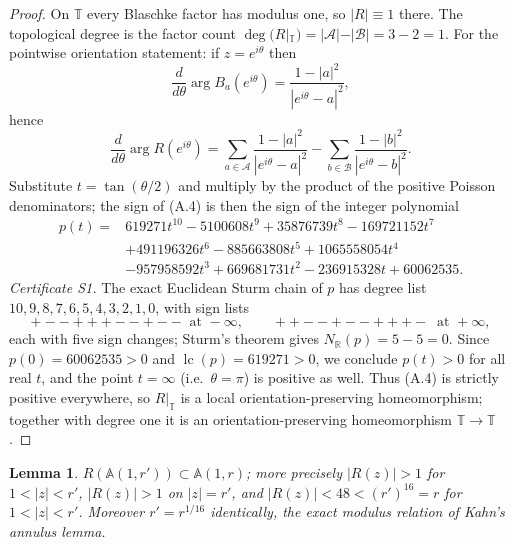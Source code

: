 \documentclass[11pt,reqno]{amsart}
\newtheorem{lemma}[theorem]{Lemma}
\theoremstyle{definition}
\theoremstyle{remark}
\begin{document}
\begin{proof}
On \(\mathbb T\) every Blaschke factor has modulus one, so \(|R|\equiv1\) there. The topological degree is the factor count \(\deg(R|_{\mathbb T})=|\mathcal A|-|\mathcal B|=3-2=1\).
For the pointwise orientation statement: if \(z=e^{i\theta}\) then
\[ \frac{d}{d\theta}\arg B_a(e^{i\theta})=\frac{1-|a|^2}{|e^{i\theta}-a|^2}, \]
hence
\[ \frac{d}{d\theta}\arg R(e^{i\theta})=\sum_{a\in\mathcal A}\frac{1-|a|^2}{|e^{i\theta}-a|^2}-\sum_{b\in\mathcal B}\frac{1-|b|^2}{|e^{i\theta}-b|^2}. \tag{A.4} \]
Substitute \(t=\tan(\theta/2)\) and multiply by the product of the positive Poisson denominators; the sign of (A.4) is then the sign of the integer polynomial
\[\begin{aligned} p(t)={}&619271t^{10}-5100608t^{9}+35876739t^{8}-169721152t^{7}\\ &+491196326t^{6}-885663808t^{5}+1065558054t^{4}\\ &-957958592t^{3}+669681731t^{2}-236915328t+60062535. \end{aligned}\tag{A.5}\]
\emph{Certificate S1.} The exact Euclidean Sturm chain of \(p\) has degree list \(10,9,8,7,6,5,4,3,2,1,0\), with sign lists
\[ +--+++--+--\ \text{ at } -\infty,\qquad ++--+--+++-\ \text{ at } +\infty, \]
each with five sign changes; Sturm's theorem gives \(N_{\mathbb R}(p)=5-5=0\). Since \(p(0)=60062535>0\) and \(\operatorname{lc}(p)=619271>0\), we conclude \(p(t)>0\) for all real \(t\), and the point \(t=\infty\) (i.e.\ \(\theta=\pi\)) is positive as well. Thus (A.4) is strictly positive everywhere, so \(R|_{\mathbb T}\) is a local orientation-preserving homeomorphism; together with degree one it is an orientation-preserving homeomorphism \(\mathbb T\to\mathbb T\).
\end{proof}
\begin{lemma}\label{lem:containment}
\(R(\mathbb A(1,r'))\subset\mathbb A(1,r)\); more precisely \(|R(z)|>1\) for \(1<|z|<r'\), \(|R(z)|>1\) on \(|z|=r'\), and \(|R(z)|<48<(r')^{16}=r\) for \(1<|z|<r'\). Moreover \(r'=r^{1/16}\) identically, the exact modulus relation of Kahn's annulus lemma.
\end{lemma}
\end{document}
